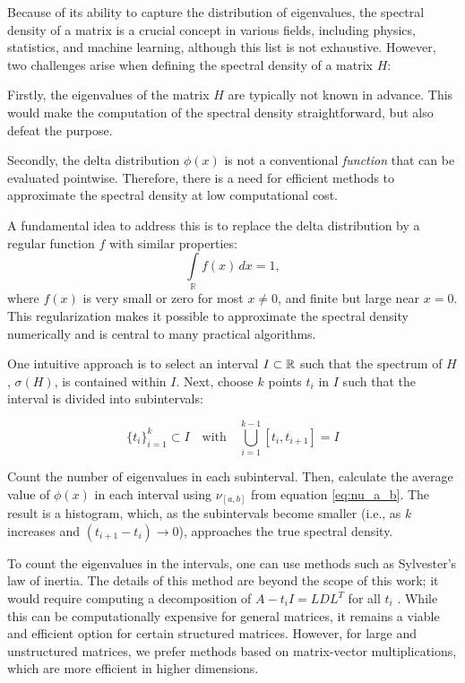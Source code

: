 Because of its ability to capture the distribution of eigenvalues,
the spectral density of a matrix is a crucial concept in various fields, including physics, statistics,
and machine learning, although this list is not exhaustive.
However, two challenges arise when defining the spectral density of a matrix $H$:

Firstly, the eigenvalues of the matrix $H$ are typically not known in advance.
This would make the computation of the spectral density straightforward, but also defeat the purpose.

Secondly, the delta distribution $\phi(x)$ is not a conventional \emph{function} that can be evaluated pointwise.
Therefore, there is a need for efficient methods to approximate the spectral density at low computational cost.

A fundamental idea to address this is to replace the delta distribution by a regular function $f$ with similar properties:
\[
\int\limits_{\mathbb{R}} f(x)\, dx = 1,
\]
where $f(x)$ is very small or zero for most $x \neq 0$, and finite but large near $x = 0$.
This regularization makes it possible to approximate the spectral density numerically and is central to many practical algorithms.

One intuitive approach is to select an interval $I \subset \mathbb{R}$ such that the spectrum of $H$, $\sigma(H)$, is contained within $I$.
Next, choose $k$ points $t_i$ in $I$ such that the interval is divided into subintervals:

\[
\{t_i\}_{i = 1}^k \subset I \quad \text{with} \quad \bigcup_{i = 1}^{k - 1} [t_i, t_{i+1}] = I
\]

Count the number of eigenvalues in each subinterval.
Then, calculate the average value of $\phi(x)$ in each interval using $\nu_{[a, b]}$ from equation \ref{eq:nu_a_b}.
The result is a histogram, which, as the subintervals become smaller (i.e., as $k$ increases and $(t_{i+1} - t_i) \longrightarrow 0$), approaches the true spectral density.

To count the eigenvalues in the intervals, one can use methods such as Sylvester's law of inertia.
The details of this method are beyond the scope of this work;
it would require computing a decomposition of $A - t_i I = LDL^T$ for all $t_i$ \cite{golubvanloan}.
While this can be computationally expensive for general matrices,
it remains a viable and efficient option for certain structured matrices.
However, for large and unstructured matrices, we prefer methods based on matrix-vector multiplications,
which are more efficient in higher dimensions.